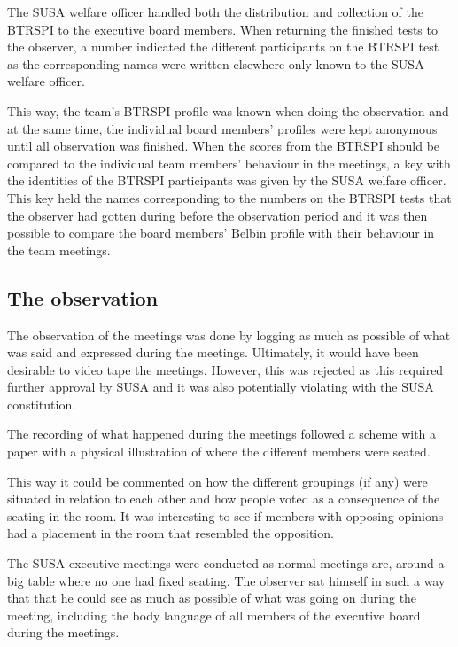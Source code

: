 \documentclass[a4paper,12pt,titlepage]{report}
\begin{document}
  The SUSA welfare officer handled both the distribution and
  collection of the BTRSPI to the executive board members.
  When returning the finished tests to the observer,
  a number indicated the different participants on the BTRSPI test
  as the corresponding names were written elsewhere only known to
  the SUSA welfare officer.

  This way, the team's BTRSPI profile was known when doing the observation
  and at the same time, the individual board members' profiles were kept anonymous
  until all observation was finished. When the scores from the BTRSPI should
  be compared to the individual team members'
  behaviour in the meetings, a key with the identities of
  the BTRSPI participants was given by the SUSA welfare officer. This key held
  the names corresponding to the numbers on the BTRSPI tests that the observer
  had gotten during before the observation period and it was then possible to
  compare the board members' Belbin profile with their behaviour in the
  team meetings.

  \subsection{The observation}
  The observation of the meetings was done by logging as much as possible of
  what was said and expressed during the meetings. Ultimately, it would have been
  desirable to video tape the meetings. However, this was rejected as this
  required further approval by SUSA and it was also potentially violating
  with the SUSA constitution.

  The recording of what happened during the meetings followed a scheme with a paper
  with a physical illustration of where the different members were seated.

  This way it could be commented on how the different
  groupings (if any) were situated in relation to each other and how people voted
  as a consequence of the seating in the room. It was interesting to see
  if members with opposing opinions had a placement in the room that resembled
  the opposition.

  The SUSA executive meetings were conducted as normal meetings are, around a big
  table where no one had fixed seating. The observer sat himself in
  such a way that that he could see as much as possible of what was going on during
  the meeting, including the body language of all members of the executive
  board during the meetings.
\end{document}
